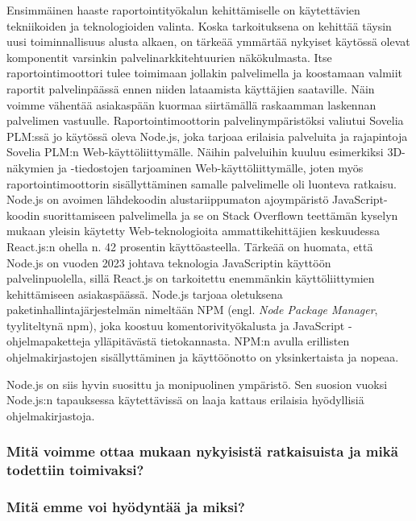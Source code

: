 Ensimmäinen haaste raportointityökalun kehittämiselle on käytettävien tekniikoiden ja teknologioiden valinta. Koska tarkoituksena on kehittää täysin uusi toiminnallisuus alusta alkaen, on tärkeää ymmärtää nykyiset käytössä olevat komponentit varsinkin palvelinarkkitehtuurien näkökulmasta. Itse raportointimoottori tulee toimimaan jollakin palvelimella ja koostamaan valmiit raportit palvelinpäässä ennen niiden lataamista käyttäjien saataville. Näin voimme vähentää asiakaspään kuormaa siirtämällä raskaamman laskennan palvelimen vastuulle. Raportointimoottorin palvelinympäristöksi valiutui Sovelia PLM:ssä jo käytössä oleva Node.js, joka tarjoaa erilaisia palveluita ja rajapintoja Sovelia PLM:n Web-käyttöliittymälle. Näihin palveluihin kuuluu esimerkiksi 3D-näkymien ja -tiedostojen tarjoaminen Web-käyttöliittymälle, joten myös raportointimoottorin sisällyttäminen samalle palvelimelle oli luonteva ratkaisu. Node.js on avoimen lähdekoodin alustariippumaton ajoympäristö JavaScript-koodin suorittamiseen palvelimella ja se on Stack Overflown teettämän kyselyn mukaan yleisin käytetty Web-teknologioita ammattikehittäjien keskuudessa React.js:n ohella n. 42 prosentin käyttöasteella. \cite{stackoverflowStackOverflow} Tärkeää on huomata, että Node.js on vuoden 2023 johtava teknologia JavaScriptin käyttöön palvelinpuolella, sillä React.js on tarkoitettu enemmänkin käyttöliittymien kehittämiseen asiakaspäässä. Node.js tarjoaa oletuksena paketinhallintajärjestelmän nimeltään NPM (engl. \textit{Node Package Manager}, tyyliteltynä npm), joka koostuu komentorivityökalusta ja JavaScript -ohjelmapaketteja ylläpitävästä tietokannasta. NPM:n avulla erillisten ohjelmakirjastojen sisällyttäminen ja käyttöönotto on yksinkertaista ja nopeaa. \cite{npmjsAbout}

Node.js on siis hyvin suosittu ja monipuolinen ympäristö. Sen suosion vuoksi Node.js:n tapauksessa käytettävissä on laaja kattaus erilaisia hyödyllisiä ohjelmakirjastoja.

\subsubsection{Mitä voimme ottaa mukaan nykyisistä ratkaisuista ja mikä todettiin toimivaksi?}

\subsubsection{Mitä emme voi hyödyntää ja miksi?}
